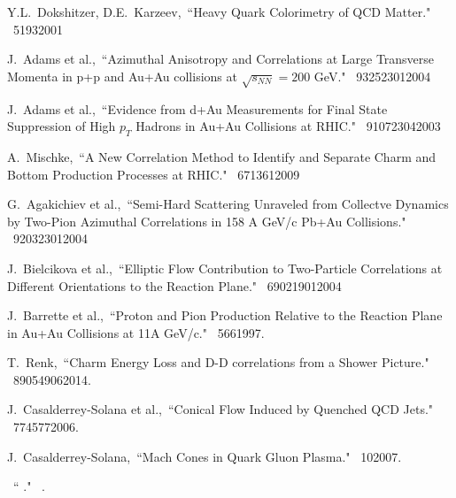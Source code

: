\begin{thebibliography}{1000}
Y.L.~Dokshitzer, D.E.~Karzeev,~``Heavy Quark Colorimetry of QCD Matter." \Journal{\PLB} {~519}{3}{2001}

J.~Adams et al.,~``Azimuthal Anisotropy and Correlations at Large Transverse Momenta in p+p and Au+Au collisions at $\sqrt{s_{NN}} = 200$ GeV." \Journal{\PRL} {~93}{252301}{2004}

J.~Adams et al.,~``Evidence from d+Au Measurements for Final State Suppression of High $p_T$ Hadrons in Au+Au Collisions at RHIC." \Journal{\PRL} {~91}{072304}{2003}

A.~Mischke,~``A New Correlation Method to Identify and Separate Charm and Bottom Production Processes at RHIC." \Journal{\PLB} {~671}{361}{2009}

G.~Agakichiev et al.,~``Semi-Hard Scattering Unraveled from Collectve Dynamics by Two-Pion Azimuthal Correlations in 158 A GeV/c Pb+Au Collisions." \Journal{\PRL} {~92}{032301}{2004}

J.~Bielcikova et al.,~``Elliptic Flow Contribution to Two-Particle Correlations at Different Orientations to the Reaction Plane." \Journal{\PRC} {~69}{021901}{2004}

J.~Barrette et al.,~``Proton and Pion Production Relative to the Reaction Plane in Au+Au Collisions at 11A GeV/c." \Journal{\PRC} {~56}{6}{1997}.

T.~Renk,~``Charm Energy Loss and D-D correlations from a Shower Picture." \Journal{\PRC} {~89}{054906}{2014}.

J.~Casalderrey-Solana et al.,~``Conical Flow Induced by Quenched QCD Jets." \Journal{\NPA} {~774}{577}{2006}.

J.~Casalderrey-Solana,~``Mach Cones in Quark Gluon Plasma." \Journal{\JPG} {~10}{}{2007}.

\bibitem{}
~`` ." \Journal{} {~}{}{}.

\end{thebibliography}
